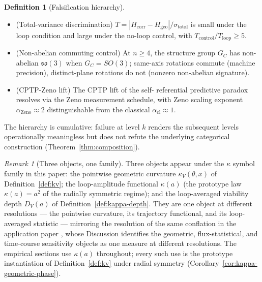 \documentclass[11pt,a4paper]{article}
\theoremstyle{plain}
\theoremstyle{definition}
\newtheorem{definition}[theorem]{Definition}
\theoremstyle{remark}
\newtheorem{remark}[theorem]{Remark}
\newcommand{\kk}{\kappa_{\!V}}
\newcommand{\so}{\mathfrak{so}}
\begin{document}
\begin{definition}[Falsification hierarchy]
\begin{itemize}[leftmargin=1.2em,itemsep=2pt]
$\bigl(\sum_k (C_{\mathrm{fat}}\,a_k^{3/2})^{2}\bigr)^{1/2}$
(Remark~\ref{rem:fatigue-convention}).
\item[\textbf{E.}] (Total-variance discrimination) $T =
|H_{\mathrm{corr}}-H_{\mathrm{geo}}|/\sigma_{\mathrm{total}}$ is small
under the loop condition and large under the no-loop control, with
$T_{\mathrm{control}}/T_{\mathrm{loop}}\geq 5$.
\item[\textbf{F.}] (Non-abelian commuting control) At $n\geq 4$, the
structure group $G_C$ has non-abelian $\so(3)$ when $G_C = SO(3)$; same-axis
rotations commute (machine precision), distinct-plane rotations do not
(nonzero non-abelian signature).
\item[\textbf{G.}] (CPTP-Zeno lift) The CPTP lift of the self-
referential predictive paradox resolves via the Zeno measurement
schedule, with Zeno scaling exponent $\alpha_{\mathrm{Zeno}}\approx 2$
distinguishable from the classical $\alpha_{\mathrm{cl}}\approx 1$.
\end{itemize}
\end{definition}

The hierarchy is cumulative: failure at level $k$ renders the
subsequent levels operationally meaningless but does not refute the
underlying categorical construction (Theorem~\ref{thm:composition}).

\begin{remark}[Three objects, one family]
\label{rem:kappa-family}
Three objects appear under the $\kappa$ symbol family in this paper:
the pointwise geometric curvature $\kk(\theta,x)$ of
Definition~\ref{def:kv}; the loop-amplitude functional $\kappa(a)$
(the prototype law $\kappa(a)=a^{2}$ of the radially symmetric
regime); and the loop-averaged viability depth $D_V(a)$ of
Definition~\ref{def:kappa-depth}. They are one object at different
resolutions --- the pointwise curvature, its trajectory functional,
and its loop-averaged statistic --- mirroring the resolution of the
same conflation in the application paper \citep{zai2026measure},
whose Discussion identifies the geometric, flux-statistical, and
time-course sensitivity objects as one measure at different
resolutions. The empirical sections use $\kappa(a)$ throughout;
every such use is the prototype instantiation of
Definition~\ref{def:kv} under radial symmetry
(Corollary~\ref{cor:kappa-geometric-phase}).
\end{remark}
\end{document}
